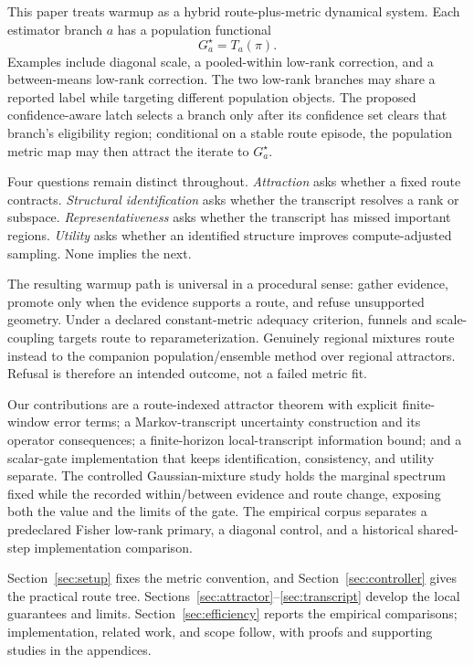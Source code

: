 \documentclass[11pt]{article}
\theoremstyle{plain}
\theoremstyle{definition}
\theoremstyle{remark}
\begin{document}
This paper treats warmup as a hybrid route-plus-metric dynamical system. Each
estimator branch $a$ has a population functional
\[
  G_a^\star=T_a(\pi).
\]
Examples include diagonal scale, a pooled-within low-rank correction, and a
between-means low-rank correction. The two low-rank branches may share a
reported label while targeting different population objects. The proposed
confidence-aware latch selects a branch only after its confidence set clears
that branch's eligibility region; conditional on a stable route episode, the
population metric map may then attract the iterate to $G_a^\star$.

Four questions remain distinct throughout. \emph{Attraction} asks whether a
fixed route contracts. \emph{Structural identification} asks whether the
transcript resolves a rank or subspace. \emph{Representativeness} asks whether
the transcript has missed important regions. \emph{Utility} asks whether an
identified structure improves compute-adjusted sampling. None implies the next.

The resulting warmup path is universal in a procedural sense: gather evidence,
promote only when the evidence supports a route, and refuse unsupported
geometry. Under a declared constant-metric adequacy criterion, funnels and
scale-coupling targets route to reparameterization. Genuinely regional mixtures
route instead to the companion population/ensemble method over regional
attractors. Refusal is therefore an intended outcome, not a failed metric fit.

Our contributions are a route-indexed attractor theorem with explicit finite-
window error terms; a Markov-transcript uncertainty construction and its
operator consequences; a finite-horizon local-transcript information bound;
and a scalar-gate implementation that keeps identification, consistency, and
utility separate. The controlled Gaussian-mixture study holds the marginal
spectrum fixed while the recorded within/between evidence and route change,
exposing both the value and the limits of the gate. The empirical corpus
separates a predeclared Fisher low-rank primary, a diagonal control, and a
historical shared-step implementation comparison.

Section~\ref{sec:setup} fixes the metric convention, and
Section~\ref{sec:controller} gives the practical route tree.
Sections~\ref{sec:attractor}--\ref{sec:transcript} develop the local guarantees
and limits. Section~\ref{sec:efficiency} reports the empirical comparisons;
implementation, related work, and scope follow, with proofs and supporting
studies in the appendices.
\end{document}
